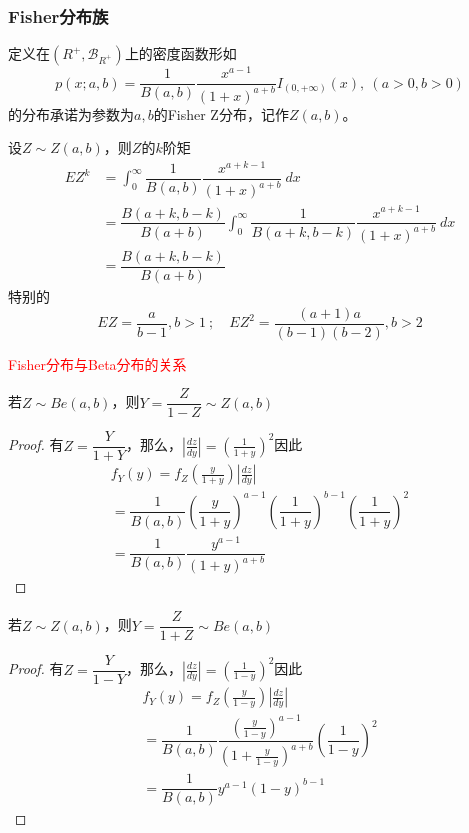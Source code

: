 \subsubsection{Fisher分布族}

\begin{definition}
    定义在$(R^+,\mathscr{B}_{R^+})$上的密度函数形如
    \[
        p(x;a,b) = \dfrac{1}{B(a,b)}\dfrac{x^{a-1}}{(1+x)^{a+b}}I_{(0,+\infty)}(x),\ (a>0,b>0)
    \]
    的分布承诺为参数为$a,b$的Fisher Z分布，记作$Z(a,b)$。
\end{definition}
设$Z\sim Z(a,b)$，则$Z$的$k$阶矩
\[
    \begin{array}{ll}
        EZ^k &= \displaystyle\int_{0}^{\infty}\dfrac{1}{B(a,b)}\dfrac{x^{a+k-1}}{(1+x)^{a+b}}\ dx\\
        &=\dfrac{B(a+k,b-k)}{B(a+b)}\displaystyle\int_{0}^{\infty}\dfrac{1}{B(a+k,b-k)}\dfrac{x^{a+k-1}}{(1+x)^{a+b}}\ dx\\
        &= \dfrac{B(a+k,b-k)}{B(a+b)}
    \end{array}
\]
特别的
\[
    EZ = \dfrac{a}{b-1},b>1\ ;\quad EZ^2 = \dfrac{(a+1)a}{(b-1)(b-2)}, b>2
\]

\textcolor{red}{Fisher分布与Beta分布的关系}

若$Z\sim Be(a,b)$，则$Y = \dfrac{Z}{1-Z}\sim Z(a,b)$
\begin{proof}
    有$Z = \dfrac{Y}{1+Y}$，那么，$|\frac{dz}{dy}| = (\frac{1}{1+y})^2$因此
    \[
        \begin{array}{l}
            f_Y(y) = f_Z(\frac{y}{1+y})|\frac{dz}{dy}|\\
            =\dfrac{1}{B(a,b)}(\dfrac{y}{1+y})^{a-1}(\dfrac{1}{1+y})^{b-1}(\dfrac{1}{1+y})^2\\
            =\dfrac{1}{B(a,b)}\dfrac{y^{a-1}}{(1+y)^{a+b}}
        \end{array}
    \]
\end{proof}

若$Z\sim Z(a,b)$，则$Y = \dfrac{Z}{1+Z}\sim Be(a,b)$
\begin{proof}
    有$Z = \dfrac{Y}{1-Y}$，那么，$|\frac{dz}{dy}| = (\frac{1}{1-y})^2$因此
    \[
        \begin{array}{l}
            f_Y(y) = f_Z(\frac{y}{1-y})|\frac{dz}{dy}|\\
            =\dfrac{1}{B(a,b)}\dfrac{(\frac{y}{1-y})^{a-1}}{(1+\frac{y}{1-y})^{a+b}}(\dfrac{1}{1-y})^{2}\\
            =\dfrac{1}{B(a,b)}y^{a-1}(1-y)^{b-1}
        \end{array}
    \]
\end{proof}

